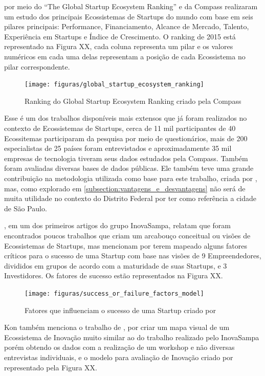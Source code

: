  por meio do ``The Global Startup Ecosystem Ranking'' e da Compass realizaram um estudo dos principais Ecossistemas de Startups do mundo com base em seis pilares principais: Performance, Financiamento, Alcance de Mercado, Talento, Experiência em Startups e Índice de Crescimento. O ranking de 2015 está representado na Figura XX, cada coluna representa um pilar e os valores numéricos em cada uma delas representam a posição de cada Ecossistema no pilar correspondente. 

\begin{figure}[!htb]
\centering
\texttt{[image: figuras/global\_startup\_ecosystem\_ranking]}
\caption{Ranking do Global Startup Ecosystem Ranking criado pela Compass}
\label{figure:global_startup_ecosystem_ranking}
\end{figure}

Esse é um dos trabalhos disponíveis mais extensos que já foram realizados no contexto de Ecossistemas de Startups, cerca de 11 mil participantes de 40 Ecossitemas participaram da pesquisa por meio de questionários, mais de 200 especialistas de 25 países foram entrevistados e aproximadamente 35 mil empresas de tecnologia tiveram seus dados estudados pela Compass. Também foram avaliadas diversas bases de dados públicas. Ele também teve uma grande contribuição na metodologia utilizada como base para este trabalho, criada por , mas, como explorado em \ref{subsection:vantagens_e_desvantagens} não será de muita utilidade no contexto do Distrito Federal por ter como referência a cidade de São Paulo.

, em um dos primeiros artigos do grupo InovaSampa, relatam que foram encontrados poucos trabalhos que criam um arcabouço conceitual ou visões de Ecossistemas de Startups, mas mencionam  por terem mapeado alguns fatores críticos para o sucesso de uma Startup com base nas visões de 9 Empreendedores, divididos em grupos de acordo com a maturidade de suas Startups, e 3 Investidores. Os fatores de sucesso estão representados na Figura XX.

\begin{figure}[!htb]
\centering
\texttt{[image: figuras/success\_or\_failure\_factors\_model]}
\caption{Fatores que influenciam o sucesso de uma Startup criado por }
\label{figure:success_or_failure_factors_model}
\end{figure}

Kon também menciona o trabalho de , por criar um mapa visual de um Ecossistema de Inovação muito similar ao do trabalho realizado pelo InovaSampa porém obtendo os dados com a realização de um workshop e não diversas entrevistas individuais, e o modelo para avaliação de Inovação criado por  representado pela Figura XX. 

